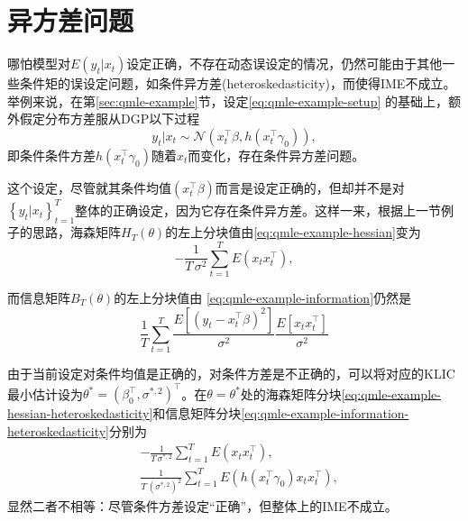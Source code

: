 \section{异方差问题}
\label{sec:qmle-ime-heteroskedasticity}

哪怕模型对$E \left( y_{t} | x_{t} \right)$设定正确，不存在动态误设定的情况，仍然可能由于其他一些条件矩的误设定问题，如条件异方差(heteroskedasticity)，而使得IME不成立。举例来说，在第\ref{sec:qmle-example}节，设定\eqref{eq:qmle-example-setup}
的基础上，额外假定分布方差服从DGP以下过程
\begin{equation}
    \label{eq:eq:qmle-example-variance-setup}
    y_{t} | x_{t} \sim \mathcal{N} \left( x_{t}^{\top} \beta, h \left(x_{t}^{\top} \gamma_{0} \right) \right),
\end{equation}
即条件条件方差$h \left(x_{t}^{\top} \gamma_{0} \right)$随着$x_{t}$而变化，存在条件异方差问题。

这个设定，尽管就其条件均值$\left( x_{t}^{\top} \beta \right)$而言是设定正确的，但却并不是对$\left\{ y_{t} | x_{t} \right\}_{t=1}^{T}$整体的正确设定，因为它存在条件异方差。这样一来，根据上一节例子的思路，海森矩阵$H_{T} \left( \theta \right)$的左上分块值由\eqref{eq:qmle-example-hessian}变为
\begin{equation}
    \label{eq:qmle-example-hessian-heteroskedasticity}
    - \frac{1}{T \, \sigma^{2}} \sum_{t=1}^{T} E \left( x_{t} x_{t}^{\top} \right), %
\end{equation}

而信息矩阵$B_{T} \left( \theta \right)$的左上分块值由 \eqref{eq:qmle-example-information}仍然是
\begin{equation}
    \label{eq:qmle-example-information-heteroskedasticity}
    \frac{1}{T} \sum_{t=1}^{T} \frac{
    E \left[
    \left( y_{t} - x_{t}^{\top} \beta \right)^{2}
    \right]
    }{
    \sigma^{2}
    }
    \frac{
    E \left[ x_{t} x_{t}^{\top} \right]
    }{
    \sigma^{2}
    }
\end{equation}

由于当前设定对条件均值是正确的，对条件方差是不正确的，可以将对应的KLIC最小估计设为$\theta^{*} = \left(\beta_{0}^{\top}, \sigma^{*,2} \right)^{\top}$。在$\theta = \theta^{*}$处的海森矩阵分块\eqref{eq:qmle-example-hessian-heteroskedasticity}和信息矩阵分块\eqref{eq:qmle-example-information-heteroskedasticity}分别为
\begin{align*}
    & - \frac{1}{T \, \sigma^{*,2}} \sum_{t=1}^{T} E \left( x_{t} x_{t}^{\top} \right), \\
    & \frac{1}{T \, \left( \sigma^{*,2} \right)^{2}} \sum_{t=1}^{T} E
    \left( h \left( x_{t}^{\top} \gamma_{0} \right) x_{t} x_{t}^{\top} \right),
\end{align*}
显然二者不相等：尽管条件方差设定“正确”，但整体上的IME不成立。

